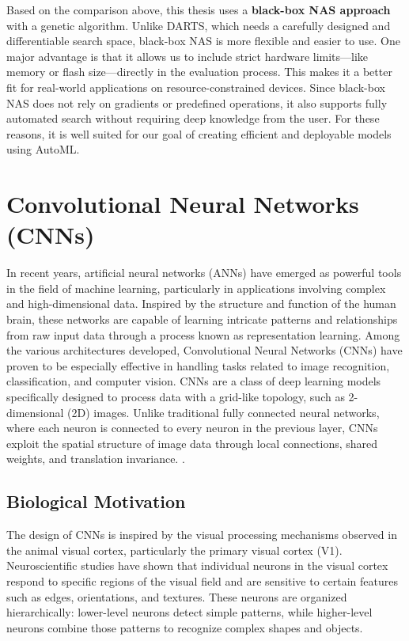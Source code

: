 \begin{sloppypar}
Based on the comparison above, this thesis uses a \textbf{black-box NAS approach} with a genetic algorithm. Unlike DARTS, which needs a carefully designed and differentiable search space, black-box NAS is more flexible and easier to use. One major advantage is that it allows us to include strict hardware limits—like memory or flash size—directly in the evaluation process. This makes it a better fit for real-world applications on resource-constrained devices. Since black-box NAS does not rely on gradients or predefined operations, it also supports fully automated search without requiring deep knowledge from the user. For these reasons, it is well suited for our goal of creating efficient and deployable models using AutoML.
\end{sloppypar}


\section{Convolutional Neural Networks (CNNs)}


In recent years, artificial neural networks (ANNs) have emerged as powerful tools in the field of machine learning, particularly in applications involving complex and high-dimensional data. Inspired by the structure and function of the human brain, these networks are capable of learning intricate patterns and relationships from raw input data through a process known as representation learning. Among the various architectures developed, Convolutional Neural Networks (CNNs) have proven to be especially effective in handling tasks related to image recognition, classification, and computer vision.
CNNs are a class of deep learning models specifically designed to process data with a grid-like topology, such as 2-dimensional (2D) images. Unlike traditional fully connected neural networks, where each neuron is connected to every neuron in the previous layer, CNNs exploit the spatial structure of image data through local connections, shared weights, and translation invariance. \cite{yamashita2018convolutional}.


\subsection{Biological Motivation}
The design of CNNs is inspired by the visual processing mechanisms observed in the animal visual cortex, particularly the primary visual cortex (V1). Neuroscientific studies have shown that individual neurons in the visual cortex respond to specific regions of the visual field and are sensitive to certain features such as edges, orientations, and textures. These neurons are organized hierarchically: lower-level neurons detect simple patterns, while higher-level neurons combine those patterns to recognize complex shapes and objects.

